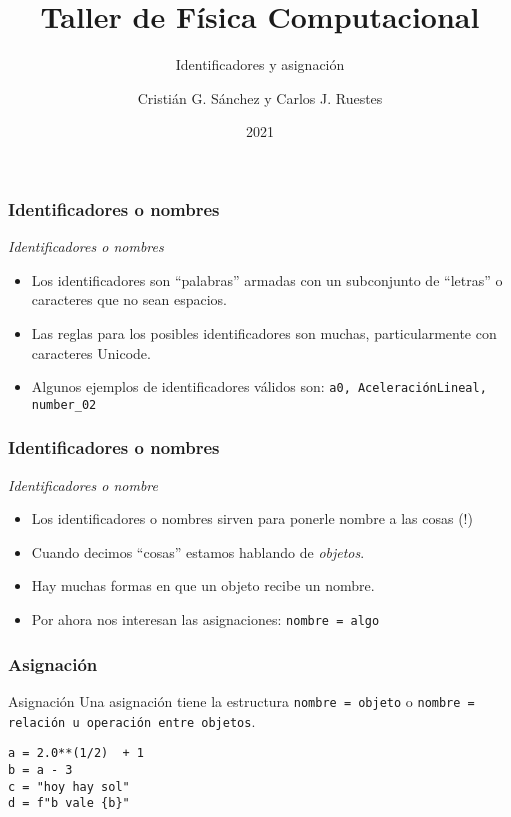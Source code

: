 \documentclass{beamer}
\title{Taller de Física Computacional}
\subtitle{Identificadores y asignación}
\author{Cristián G. Sánchez y Carlos J. Ruestes}
\date{2021}
\begin{document}
\frame{\titlepage}

\begin{frame}[fragile]
\frametitle{Identificadores o nombres}
\begin{block}{{\em Identificadores o nombres}}
\begin{itemize}
\item Los identificadores son ``palabras'' armadas con un subconjunto de ``letras'' o caracteres que no sean espacios.
\item Las reglas para los posibles identificadores son muchas, particularmente con caracteres Unicode.
\item Algunos ejemplos de identificadores válidos son: \texttt{a0, AceleraciónLineal, number_02}
\end{itemize}
\end{block}
\end{frame}

\begin{frame}[fragile]
\frametitle{Identificadores o nombres}
\begin{block}{{\em Identificadores o nombre}}
\begin{itemize}
\item Los identificadores o nombres sirven para ponerle nombre a las cosas (!)
\item Cuando decimos ``cosas'' estamos hablando de {\em objetos}.
\item Hay muchas formas en que un objeto recibe un nombre.
\item Por ahora nos interesan las \alert{asignaciones}: {\tt nombre = algo}
\end{itemize}
\end{block}
\end{frame}

\begin{frame}[fragile]
\frametitle{Asignación}
\begin{block}{Asignación}
Una asignación tiene la estructura \texttt{nombre = objeto} o  \texttt{nombre = relación u operación entre objetos}.
\begin{verbatim}
a = 2.0**(1/2)  + 1
b = a - 3
c = "hoy hay sol"
d = f"b vale {b}"
\end{verbatim}
\end{block}
\end{frame}
\end{document}
